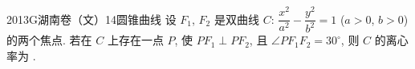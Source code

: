 
\begin{problem}{2013}{G}{湖南卷（文）}{14}{圆锥曲线}
设 $ F_1 $, $ F_2 $ 是双曲线 $ C $: $ \dfrac{x^2}{a^2}-\dfrac{y^2}{b^2}=1 $ ($ a>0 $, $ b>0 $) 的两个焦点. 若在 $ C $ 上存在一点 $ P $, 使 $ PF_1\perp PF_2 $, 且 $ \angle PF_1F_2=30^\circ $, 则 $ C $ 的离心率为 \underline{\hspace{4em}}.
\end{problem}

\begin{answer}

\end{answer}

\begin{solutions}

\end{solutions}